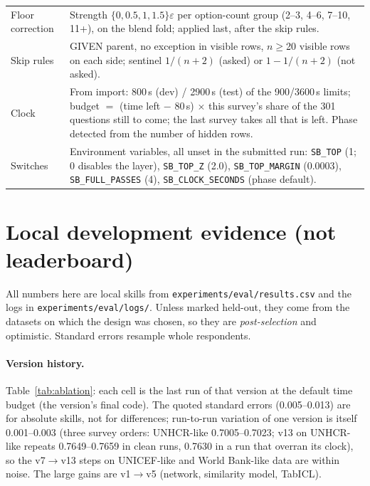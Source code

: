 \documentclass{article}
\begin{document}
\begin{table}[h]
\begin{tabular}{p{2.6cm}p{10.4cm}}
Floor correction & Strength $\{0,0.5,1,1.5\}\varepsilon$ per option-count group (2--3, 4--6, 7--10, 11+), on the blend fold; applied last, after the skip rules. \\
Skip rules & GIVEN parent, no exception in visible rows, $n\ge$20 visible rows on each side; sentinel $1/(n+2)$ (asked) or $1-1/(n+2)$ (not asked). \\
Clock & From import: 800\,s (dev) / 2900\,s (test) of the 900/3600\,s limits; budget $=$ (time left $-$ 80\,s) $\times$ this survey's share of the 301 questions still to come; the last survey takes all that is left. Phase detected from the number of hidden rows. \\
Switches & Environment variables, all unset in the submitted run: \texttt{SB\_TOP} (1; 0 disables the layer), \texttt{SB\_TOP\_Z} (2.0), \texttt{SB\_TOP\_MARGIN} (0.0003), \texttt{SB\_FULL\_PASSES} (4), \texttt{SB\_CLOCK\_SECONDS} (phase default). \\
\bottomrule
\end{tabular}
\end{table}

\section{Local development evidence (not leaderboard)}
\label{app:local}
All numbers here are local skills from \texttt{experiments/eval/results.csv} and the logs in \texttt{experiments/eval/logs/}. Unless marked held-out, they come from the datasets on which the design was chosen, so they are \emph{post-selection} and optimistic. Standard errors resample whole respondents.

\paragraph{Version history.} Table~\ref{tab:ablation}: each cell is the last run of that version at the default time budget (the version's final code). The quoted standard errors (0.005--0.013) are for absolute skills, not for differences; run-to-run variation of one version is itself 0.001--0.003 (three survey orders: UNHCR-like 0.7005--0.7023; v13 on UNHCR-like repeats 0.7649--0.7659 in clean runs, 0.7630 in a run that overran its clock), so the v7$\to$v13 steps on UNICEF-like and World Bank-like data are within noise. The large gains are v1$\to$v5 (network, similarity model, TabICL).
\end{document}
